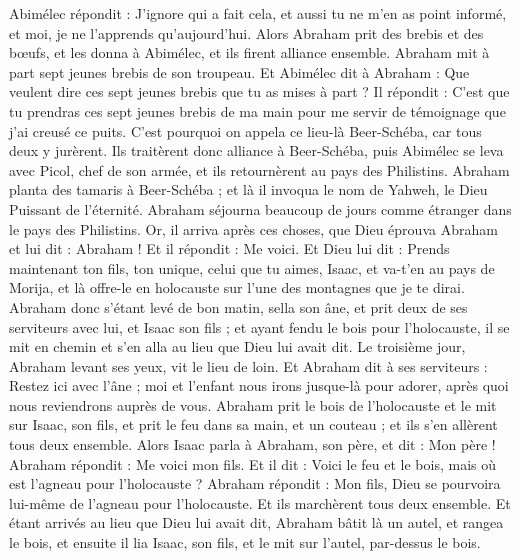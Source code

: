 \begin{multicols}{2}
Abimélec répondit : J’ignore qui a fait cela, et aussi tu ne m'en as point informé, et moi, je ne l’apprends qu’aujourd’hui.
Alors Abraham prit des brebis et des bœufs, et les donna à Abimélec, et ils firent alliance ensemble.
Abraham mit à part sept jeunes brebis de son troupeau.
Et Abimélec dit à Abraham : Que veulent dire ces sept jeunes brebis que tu as mises à part ?
Il répondit : C'est que tu prendras ces sept jeunes brebis de ma main pour me servir de témoignage que j'ai creusé ce puits.
C'est pourquoi on appela ce lieu-là Beer-Schéba, car tous deux y jurèrent.
Ils traitèrent donc alliance à Beer-Schéba, puis Abimélec se leva avec Picol, chef de son armée, et ils retournèrent au pays des Philistins.
Abraham planta des tamaris à Beer-Schéba ; et là il invoqua le nom de Yahweh, le Dieu Puissant de l’éternité.
Abraham séjourna beaucoup de jours comme étranger dans le pays des Philistins.
\VerseOne{}Or, il arriva après ces choses, que Dieu éprouva Abraham et lui dit : Abraham ! Et il répondit : Me voici.
Et Dieu lui dit : Prends maintenant ton fils, ton unique, celui que tu aimes, Isaac, et va-t'en au pays de Morija, et là offre-le en holocauste sur l'une des montagnes que je te dirai.
Abraham donc s'étant levé de bon matin, sella son âne, et prit deux de ses serviteurs avec lui, et Isaac son fils ; et ayant fendu le bois pour l'holocauste, il se mit en chemin et s'en alla au lieu que Dieu lui avait dit.
Le troisième jour, Abraham levant ses yeux, vit le lieu de loin.
Et Abraham dit à ses serviteurs : Restez ici avec l'âne ; moi et l'enfant nous irons jusque-là pour adorer, après quoi nous reviendrons auprès de vous.
Abraham prit le bois de l'holocauste et le mit sur Isaac, son fils, et prit le feu dans sa main, et un couteau ; et ils s'en allèrent tous deux ensemble.
Alors Isaac parla à Abraham, son père, et dit : Mon père ! Abraham répondit : Me voici mon fils. Et il dit : Voici le feu et le bois, mais où est l’agneau pour l'holocauste ?
Abraham répondit : Mon fils, Dieu se pourvoira lui-même de l’agneau pour l'holocauste. Et ils marchèrent tous deux ensemble.
Et étant arrivés au lieu que Dieu lui avait dit, Abraham bâtit là un autel, et rangea le bois, et ensuite il lia Isaac, son fils, et le mit sur l'autel, par-dessus le bois.

\end{multicols}
